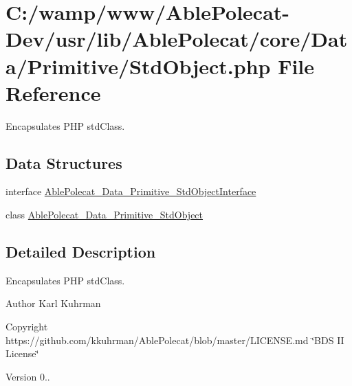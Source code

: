 \hypertarget{_std_object_8php}{}\section{C\+:/wamp/www/\+Able\+Polecat-\/\+Dev/usr/lib/\+Able\+Polecat/core/\+Data/\+Primitive/\+Std\+Object.php File Reference}
\label{_std_object_8php}


Encapsulates P\+H\+P std\+Class.  


\subsection*{Data Structures}
\begin{DoxyCompactItemize}
\item 
interface \hyperlink{interface_able_polecat___data___primitive___std_object_interface}{Able\+Polecat\+\_\+\+Data\+\_\+\+Primitive\+\_\+\+Std\+Object\+Interface}
\item 
class \hyperlink{class_able_polecat___data___primitive___std_object}{Able\+Polecat\+\_\+\+Data\+\_\+\+Primitive\+\_\+\+Std\+Object}
\end{DoxyCompactItemize}


\subsection{Detailed Description}
Encapsulates P\+H\+P std\+Class. 

\begin{DoxyAuthor}{Author}
Karl Kuhrman 
\end{DoxyAuthor}
\begin{DoxyCopyright}{Copyright}
https\+://github.com/kkuhrman/\+Able\+Polecat/blob/master/\+L\+I\+C\+E\+N\+S\+E.\+md \char`\"{}\+B\+D\+S I\+I License\char`\"{} 
\end{DoxyCopyright}
\begin{DoxyVersion}{Version}
0.. 
\end{DoxyVersion}
